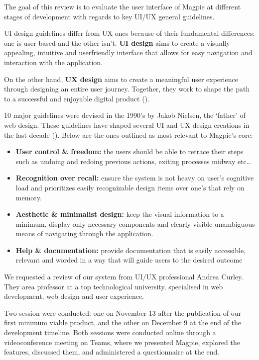 The goal of this review is to evaluate the user interface of Magpie at different
stages of development with regards to key UI/UX general guidelines.

UI design guidelines differ from UX ones because of their fundamental
differences: one is user based and the other isn't. \textbf{UI design} aims to
create a visually appealing, intuitive and user\-friendly interface that allows
for easy navigation and interaction with the application.

On the other hand, \textbf{UX design} aims to create a meaningful user
experience through designing an entire user journey. Together, they work to
shape the path to a successful and enjoyable digital product
(\cite{uiuxguidelines2023}).

10 major guidelines were devised in the 1990's by Jakob Nielsen, the
`father' of web design. These guidelines have shaped several UI and UX design
creations in the last decade (\cite{uiuxguidelinesnielsen2016}). Below are the
ones outlined as most relevant to Magpie's core:
\begin{itemize}
    \item \textbf{User control \& freedom:} the users should be able to retrace
          their steps such as undoing and redoing previous actions, exiting processes
          midway etc\ldots
          
    \item \textbf{Recognition over recall:} ensure the system is not heavy on
          user's cognitive load and prioritizes easily recognizable design items over
          one's that rely on memory.
          
    \item \textbf{Aesthetic \& minimalist design:} keep the visual information
          to a minimum, display only necessary components and clearly visible
          unambiguous means of navigating through the application.
          
    \item \textbf{Help \& documentation:} provide documentation that is easily
          accessible, relevant and worded in a way that will guide users to the
          desired outcome
\end{itemize}

We requested a review of our system from UI/UX professional Andrea
Curley. They area  professor at a top technological university, specialised in
web development, web design and user experience.

\noindent Two session were conducted: one on November 13 after the publication
of our first minimum viable product, and the other on December 9 at the end of
the development timeline. Both sessions were conducted online through a
videoconference meeting on Teams, where we presented Magpie, explored the
features, discussed them, and administered a questionnaire at the end.

